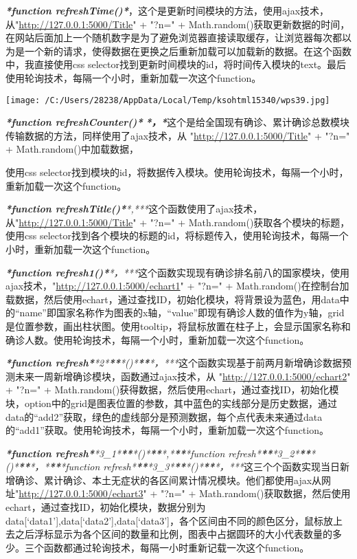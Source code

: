 \documentclass[
]{article}
\begin{document}
\emph{\textbf{*function
refreshTime()*}}，这个是更新时间模块的方法，使用ajax技术，从"\url{http://127.0.0.1:5000/Title}"
+ "?n=" +
Math.random()获取更新数据的时间，在网站后面加上一个随机数字是为了避免浏览器直接读取缓存，让浏览器每次都以为是一个新的请求，使得数据在更换之后重新加载可以加载新的数据。在这个函数中，我直接使用css
selector找到更新时间模块的id，将时间传入模块的text。最后使用轮询技术，每隔一个小时，重新加载一次这个function。

\texttt{[image: /C:/Users/28238/AppData/Local/Temp/ksohtml15340/wps39.jpg]}

\emph{\textbf{*function refreshCounter()*}}
\emph{\textbf{*，*}}这个是给全国现有确诊、累计确诊总数模块传输数据的方法，同样使用了ajax技术，从
"\url{http://127.0.0.1:5000/Title}" + "?n=" + Math.random()中加载数据，

使用css
selector找到模块的id，将数据传入模块。使用轮询技术，每隔一个小时，重新加载一次这个function。

\emph{\textbf{*function
refreshTitle()*}\textbf{}*,***}这个函数使用了ajax技术，从"\url{http://127.0.0.1:5000/Title}"
+ "?n=" + Math.random()获取各个模块的标题，使用css
selector找到各个模块的标题的id，将标题传入，使用轮询技术，每隔一个小时，重新加载一次这个function。

\emph{\textbf{*function
refresh1()*}\textbf{}*，***}这个函数实现现有确诊排名前八的国家模块，使用ajax技术，"\url{http://127.0.0.1:5000/echart1}"
+ "?n=" +
Math.random()在控制台加载数据，然后使用echart，通过查找ID，初始化模块，将背景设为蓝色，用data中的``name''即国家名称作为图表的x轴，``value''即现有确诊人数的值作为y轴，grid是位置参数，画出柱状图。使用tooltip，将鼠标放置在柱子上，会显示国家名称和确诊人数。使用轮询技术，每隔一个小时，重新加载一次这个function。

\emph{\textbf{*function
refresh*}\textbf{}*2*\textbf{**}*()*\textbf{**}*，***}这个函数实现基于前两月新增确诊数据预测未来一周新增确诊模块，函数通过ajax技术，从
"\url{http://127.0.0.1:5000/echart2}" + "?n=" +
Math.random()获得数据，然后使用echart，通过查找ID，初始化模块，option中的grid是图表位置的参数，其中蓝色的实线部分是历史数据，通过data的``add2''获取，绿色的虚线部分是预测数据，每个点代表未来通过data的``add1''获取。使用轮询技术，每隔一个小时，重新加载一次这个function。

\emph{\textbf{*function
refresh*}\textbf{}*3\_1*\textbf{**}*()*\textbf{**}*,*\textbf{**}*function
refresh*\textbf{**}*3\_2*\textbf{**}*()*\textbf{**}*，*\textbf{**}*function
refresh*\textbf{**}*3\_3*\textbf{**}*()*\textbf{**}*，***}这三个个函数实现当日新增确诊、累计确诊、本土无症状的各区间累计情况模块。他们都使用ajax从网址"\url{http://127.0.0.1:5000/echart3}"
+ "?n=" +
Math.random()获取数据，然后使用echart，通过查找ID，初始化模块，数据分别为data{[}`data1'{]},data{[}`data2'{]},data{[}`data3'{]}，各个区间由不同的颜色区分，鼠标放上去之后浮标显示为各个区间的数量和比例，图表中占据圆环的大小代表数量的多少。三个函数都通过轮询技术，每隔一小时重新记载一次这个function。
\end{document}
